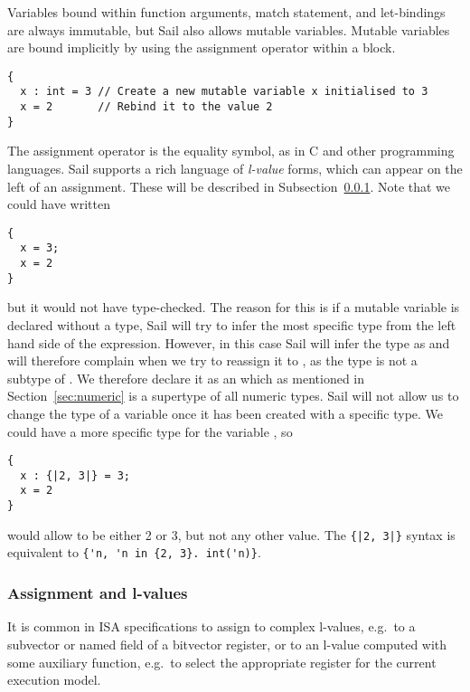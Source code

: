 Variables bound within function arguments, match statement, and
let-bindings are always immutable, but Sail also allows mutable
variables. Mutable variables are bound implicitly by using the
assignment operator within a block.
\begin{lstlisting}
{
  x : int = 3 // Create a new mutable variable x initialised to 3
  x = 2       // Rebind it to the value 2
}
\end{lstlisting}
The assignment operator is the equality symbol, as in C and other
programming languages. Sail supports a rich language of \emph{l-value}
forms, which can appear on the left of an assignment. These will be
described in Subsection~\ref{sec:lexp}. Note that we could have
written
\begin{lstlisting}
{
  x = 3;
  x = 2
}
\end{lstlisting}
but it would not have type-checked. The reason for this is if a
mutable variable is declared without a type, Sail will try to infer
the most specific type from the left hand side of the
expression. However, in this case Sail will infer the type as
 and will therefore complain when we try to reassign it to
, as the type  is not a subtype of . We
therefore declare it as an  which as mentioned in
Section~\ref{sec:numeric} is a supertype of all numeric types. Sail
will not allow us to change the type of a variable once it has been
created with a specific type. We could have a more specific type for
the variable , so
\begin{lstlisting}
{
  x : {|2, 3|} = 3;
  x = 2
}
\end{lstlisting}
would allow  to be either 2 or 3, but not any other value. The
\lstinline+{|2, 3|}+ syntax is equivalent to \lstinline+{'n, 'n in {2, 3}. int('n)}+.

\subsubsection{Assignment and l-values}
\label{sec:lexp}

It is common in ISA specifications to assign to complex l-values,
e.g.~to a subvector or named field of a bitvector register, or to an
l-value computed with some auxiliary function, e.g.~to select the
appropriate register for the current execution model.

